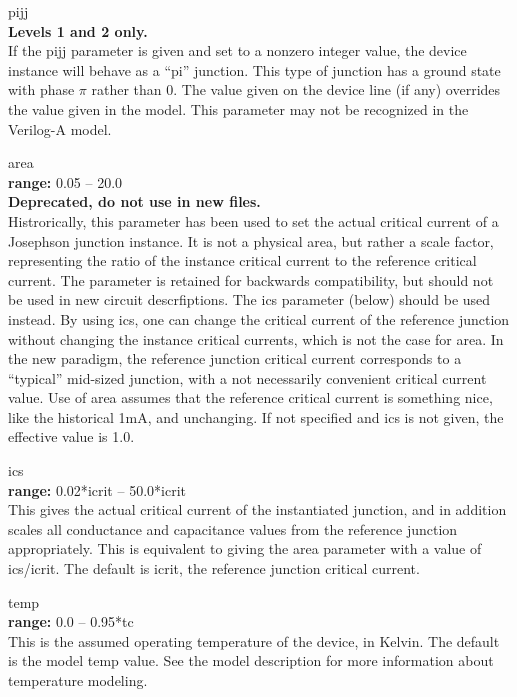 \begin{description}
\item{\vt pijj}\\
{\bf Levels 1 and 2 only.}\\
If the {\vt pijj} parameter is given and set to a nonzero integer
value, the device instance will behave as a ``pi'' junction.  This
type of junction has a ground state with phase $\pi$ rather than 0. 
The value given on the device line (if any) overrides the value given
in the model.  This parameter may not be recognized in the Verilog-A
model.

\item{\vt area}\\
{\bf range:} 0.05 -- 20.0\\
{\bf Deprecated, do not use in new files.}\\
Histrorically, this parameter has been used to set the actual critical
current of a Josephson junction instance.  It is not a physical area,
but rather a scale factor, representing the ratio of the instance
critical current to the reference critical current.  The parameter is
retained for backwards compatibility, but should not be used in new
circuit descrfiptions.  The {\vt ics} parameter (below) should be used
instead.  By using {\vt ics}, one can change the critical current of
the reference junction without changing the instance critical
currents, which is not the case for {\vt area}.  In the new paradigm,
the reference junction critical current corresponds to a ``typical''
mid-sized junction, with a not necessarily convenient critical current
value.  Use of {\vt area} assumes that the reference critical current
is something nice, like the historical 1mA, and unchanging.  If not
specified and {\vt ics} is not given, the effective value is 1.0.

\item{\vt ics}\\
{\bf range:} 0.02*{\vt icrit} -- 50.0*{\vt icrit}\\
This gives the actual critical current of the instantiated junction,
and in addition scales all conductance and capacitance values from the
reference junction appropriately.  This is equivalent to giving the
{\vt area} parameter with a value of {\vt ics}/{\vt icrit}.  The
default is {\vt icrit}, the reference junction critical current.

\item{\vt temp}\\
{\bf range:} 0.0 -- 0.95*{\vt tc}\\
This is the assumed operating temperature of the device, in Kelvin. 
The default is the model {\vt temp} value.  See the model description
for more information about temperature modeling.


\end{description}
